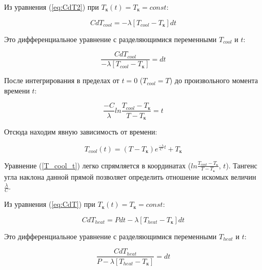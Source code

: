 \documentclass[a4paper, 12pt]{article}
\begin{document}
            Из уравнения (\ref{eq:CdT2}) при $T_к(t) = T_к = const$:

            \begin{equation}
                C dT_{cool} = - \lambda \left[ T_{cool} - T_к \right] dt
                \label{C_dT_cool}
            \end{equation}

            Это дифференциальное уравнение с разделяющимися переменными $T_{cool}$ и $t$:

            \begin{equation}
                \frac{C dT_{cool}}{- \lambda \left[ T_{cool} - T_{к} \right]} = dt
                \label{eq:diff}
            \end{equation}

            После интегрирования в пределах от $t=0$ ($T_{cool} = T$) до произвольного момента времени $t$:

            \begin{equation}
                \frac{-C}{\lambda} ln \frac{T_{cool} - T_{к}}{T - T_к} = t
                \label{eq:diff_integral}
            \end{equation}

            Отсюда находим явную зависимость от времени:

            \begin{equation}
                T_{cool}(t) = (T - T_к) e^{\frac{- \lambda}{C} t} + T_к
                \label{T_cool_t}
            \end{equation}

            Уравнение (\ref{T_cool_t}) легко спрямляется в координатах ($ln \frac{T_{cool} - T_к}{T - T_к}$, $t$). Тангенс угла наклона данной прямой позволяет определить отношение искомых величин $\frac{\lambda}{C}$.

            Из уравнения (\ref{eq:CdT}) при $T_к(t) = T_к = const$:

            \begin{equation}
                C dT_{heat} = P dt - \lambda \left[ T_{heat} - T_к \right] dt
                \label{C_dT_heat}
            \end{equation}

            Это дифференциальное уравнение с разделяющимися переменными $T_{heat}$ и $t$:

            \begin{equation}
                \frac{C dT_{heat}}{P - \lambda \left[ T_{heat} - T_{к} \right]} = dt
                \label{eq:diff2}
            \end{equation}
\end{document}
